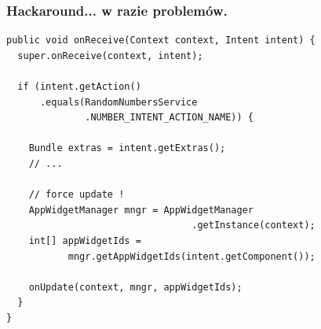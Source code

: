 \begin{frame}[fragile]\frametitle{Hackaround... w razie problemów.}
\begin{lstlisting}
public void onReceive(Context context, Intent intent) {
  super.onReceive(context, intent);

  if (intent.getAction()
      .equals(RandomNumbersService
              .NUMBER_INTENT_ACTION_NAME)) {
    
    Bundle extras = intent.getExtras();
    // ...

    // force update !
    AppWidgetManager mngr = AppWidgetManager
                                 .getInstance(context);
    int[] appWidgetIds = 
           mngr.getAppWidgetIds(intent.getComponent());
    
    onUpdate(context, mngr, appWidgetIds);
  }
}
\end{lstlisting}
\end{frame}









% 
